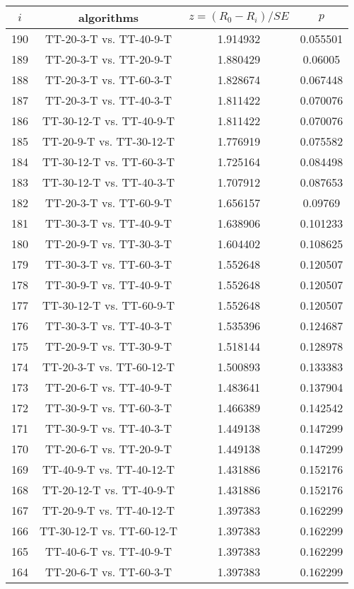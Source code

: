 \documentclass[a4paper,10pt]{article}
\begin{document}
\begin{landscape}
\begin{table}[!htp]
\centering\scriptsize
\begin{tabular}{cccc}
$i$&algorithms&$z=(R_0 - R_i)/SE$&$p$\\
\hline190&TT-20-3-T vs. TT-40-9-T&1.914932&0.055501\\
189&TT-20-3-T vs. TT-20-9-T&1.880429&0.06005\\
188&TT-20-3-T vs. TT-60-3-T&1.828674&0.067448\\
187&TT-20-3-T vs. TT-40-3-T&1.811422&0.070076\\
186&TT-30-12-T vs. TT-40-9-T&1.811422&0.070076\\
185&TT-20-9-T vs. TT-30-12-T&1.776919&0.075582\\
184&TT-30-12-T vs. TT-60-3-T&1.725164&0.084498\\
183&TT-30-12-T vs. TT-40-3-T&1.707912&0.087653\\
182&TT-20-3-T vs. TT-60-9-T&1.656157&0.09769\\
181&TT-30-3-T vs. TT-40-9-T&1.638906&0.101233\\
180&TT-20-9-T vs. TT-30-3-T&1.604402&0.108625\\
179&TT-30-3-T vs. TT-60-3-T&1.552648&0.120507\\
178&TT-30-9-T vs. TT-40-9-T&1.552648&0.120507\\
177&TT-30-12-T vs. TT-60-9-T&1.552648&0.120507\\
176&TT-30-3-T vs. TT-40-3-T&1.535396&0.124687\\
175&TT-20-9-T vs. TT-30-9-T&1.518144&0.128978\\
174&TT-20-3-T vs. TT-60-12-T&1.500893&0.133383\\
173&TT-20-6-T vs. TT-40-9-T&1.483641&0.137904\\
172&TT-30-9-T vs. TT-60-3-T&1.466389&0.142542\\
171&TT-30-9-T vs. TT-40-3-T&1.449138&0.147299\\
170&TT-20-6-T vs. TT-20-9-T&1.449138&0.147299\\
169&TT-40-9-T vs. TT-40-12-T&1.431886&0.152176\\
168&TT-20-12-T vs. TT-40-9-T&1.431886&0.152176\\
167&TT-20-9-T vs. TT-40-12-T&1.397383&0.162299\\
166&TT-30-12-T vs. TT-60-12-T&1.397383&0.162299\\
165&TT-40-6-T vs. TT-40-9-T&1.397383&0.162299\\
164&TT-20-6-T vs. TT-60-3-T&1.397383&0.162299\\

\end{tabular}
\end{table}
\end{landscape}
\end{document}
